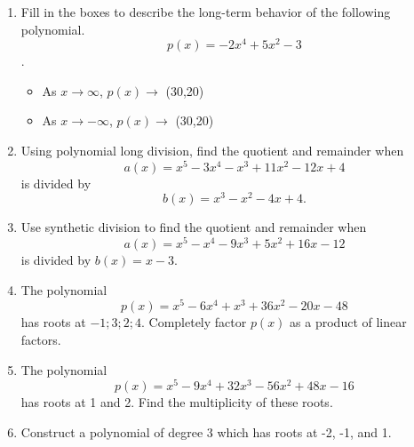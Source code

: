 \documentclass{article}
\begin{document}
\ActivityTitle[class={College Algebra}, number={3}, name={Polynomials 1}]

\begin{enumerate}
\item Fill in the boxes to describe the long-term behavior of the following polynomial. \[ p(x) = -2x^4 + 5x^2 - 3 \].

\begin{itemize}
\item As $x \rightarrow \infty$, $p(x) \rightarrow$ \framebox(30,20){} \vspace{0.5cm}
\item As $x \rightarrow -\infty$, $p(x) \rightarrow$ \framebox(30,20){}
\end{itemize} \vspace{1cm}

\item Using polynomial long division, find the quotient and remainder when \[ a(x) = x^5 - 3x^4 - x^3 + 11x^2 - 12x + 4 \] is divided by \[ b(x) = x^3 - x^2 - 4x + 4. \] \vspace{6cm}

\item Use synthetic division to find the quotient and remainder when \[ a(x) = x^5 - x^4 - 9x^3 + 5x^2 + 16x - 12 \] is divided by $b(x) = x - 3$. \vspace{3cm}

\newpage

\item The polynomial \[ p(x) = x^5 - 6x^4 + x^3 + 36x^2 - 20x - 48 \] has roots at ${-1;3;2;4}$. Completely factor $p(x)$ as a product of linear factors. \vspace{7cm}

\item The polynomial \[ p(x) = x^5 - 9x^4 + 32x^3 - 56x^2 + 48x - 16 \] has roots at 1 and 2. Find the multiplicity of these roots. \vspace{7cm}

\item Construct a polynomial of degree 3 which has roots at -2, -1, and 1. \vspace{7cm}
\end{enumerate}
\end{document}
